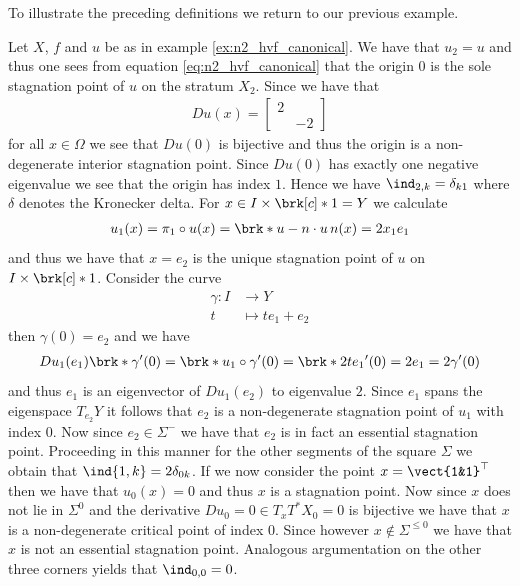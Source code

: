 To illustrate the preceding definitions we return to our previous example.
\begin{example}\label{ex:n2_hvf_index}
  Let $X$, $f$ and $u$ be as in example \ref{ex:n2_hvf_canonical}.
  We have that $u_2=u$ and thus
  one sees from equation \eqref{eq:n2_hvf_canonical}
  that the origin $0$ is the sole stagnation point of $u$ on the stratum $X_2$. Since we have that
  \begin{align*}
    Du(x) = \begin{bmatrix}
      2 & \\
       & -2
    \end{bmatrix}
  \end{align*}
  for all $x\in\Omega$ we see that $Du(0)$ is bijective and thus the origin is a non-degenerate interior stagnation point.
  Since $Du(0)$ has
  exactly one negative eigenvalue we see that the origin has index $1$. 
  Hence we have $\ind_{2,k}=\delta_{k1}$ where $\delta$ denotes the Kronecker delta.
  For $x\in I\times\brk[c]*{1}=Y$ we calculate
  \begin{align*}
    u_1(x)=\pi_1\circ u(x)=\brk*{u-n\cdot u \,n}(x)
    =2x_1e_1
  \end{align*}
  and thus we have that $x=e_2$ is the unique stagnation point of $u$ on $I\times\brk[c]*{1}$.
  Consider the curve
  \begin{align*}
    \gamma\colon I&\to Y\\
    t&\mapsto te_1+e_2
  \end{align*}
  then $\gamma(0)=e_2$ and we have
  \begin{align*}
    Du_1(e_1)\brk*{\gamma'(0)}
    =\brk*{u_1\circ \gamma}'(0)
    =\brk*{2te_1}'(0)=2e_1=2\gamma'(0)
  \end{align*}
  and thus $e_1$ is an eigenvector of $Du_1(e_2)$ to eigenvalue $2$. Since $e_1$
  spans the eigenspace $T_{e_2}Y$ it follows that $e_2$ is a non-degenerate stagnation point
  of $u_1$ with index $0$.
  Now since $e_2\in\Sigma^-$ we have that $e_2$ is in fact an essential stagnation point.
  Proceeding in this manner for the other segments of the square $\Sigma$ we obtain that
  $\ind{1,k}=2\delta_{0k}$.
  If we now consider the point $x=\vect{1&1}^\top$ then we have that $u_0(x)=0$ and thus $x$ is a stagnation
  point. Now since $x$ does not lie in $\Sigma^0$ and the derivative
  $Du_0=0\in T_xT^*X_0=0$ is bijective we have that $x$ is a non-degenerate critical point of
  index $0$. Since however $x\notin \Sigma^{\leq 0}$ we have that $x$ is not an essential stagnation point.
  Analogous argumentation on the other three corners yields that $\ind_{0,0}=0$.
\end{example}

